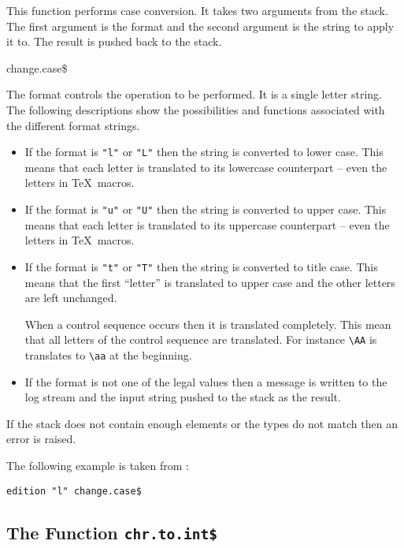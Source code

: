 This function performs case conversion. It takes two arguments from
the stack. The first argument is the format and the second argument is
the string to apply it to. The result is pushed back to the stack.

\begin{BstFunction}{change.case\$}
\end{BstFunction}

The format controls the operation to be performed. It is a single
letter string. The following descriptions show the possibilities and
functions associated with the different format strings.

\begin{itemize}
\item If the format is \verb|"l"| or \verb|"L"| then the string is
  converted to lower case. This means that each letter is translated
  to its lowercase counterpart -- even the letters in \TeX\ macros.
\item If the format is \verb|"u"| or \verb|"U"| then the string is
  converted to upper case. This means that each letter is translated
  to its uppercase counterpart -- even the letters in \TeX\ macros.
\item If the format is \verb|"t"| or \verb|"T"| then the string is
  converted to title case. This means that the first ``letter'' is
  translated to upper case and the other letters are left unchanged.
  
  When a control sequence occurs then it is translated completely.
  This mean that all letters of the control sequence are translated.
  For instance \verb|\AA| is translates to \verb|\aa| at the
  beginning.
\item If the format is not one of the legal values then a message is
  written to the log stream and the input string pushed to the stack
  as the result.
\end{itemize}

If the stack does not contain enough elements or the types do not
match then an error is raised.

The following example is taken from :

\begin{lstlisting}[language=bst]
  edition "l" change.case$
\end{lstlisting}


\subsection{The Function \texttt{chr.to.int\$}}%

